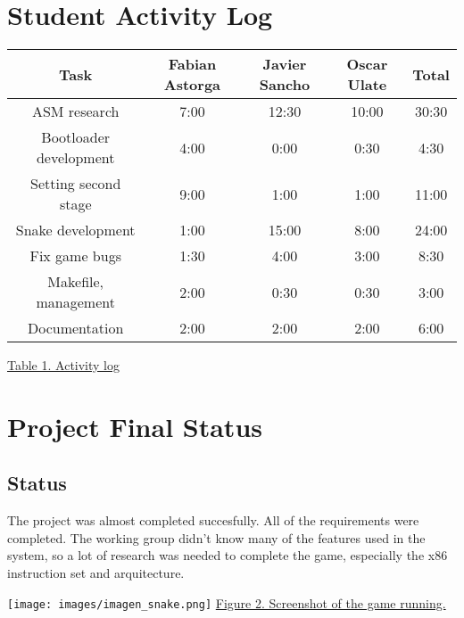\documentclass[11pt]{book}
\begin{document}
\newpage
\section*{Student Activity Log}

\begin{center}
  \begin{tabular}{|c|c|c|c|c|}
        \hline
    Task & Fabian Astorga & Javier Sancho & Oscar Ulate & Total \\
    \hline
    \hline
    ASM research & 7:00 & 12:30 & 10:00 & 30:30 \\
    \hline
    Bootloader development & 4:00 & 0:00 & 0:30 & 4:30 \\
    \hline
    Setting second stage & 9:00 & 1:00 & 1:00 & 11:00 \\
    \hline
    Snake development & 1:00 & 15:00 & 8:00 & 24:00 \\
    \hline
    Fix game bugs & 1:30 & 4:00 & 3:00 & 8:30 \\
    \hline
    Makefile, management & 2:00 & 0:30 & 0:30 & 3:00 \\
    \hline
    Documentation & 2:00 & 2:00 & 2:00 & 6:00 \\
    \hline

  \end{tabular}
  \newline \newline
  \underline{Table 1. Activity log}
\end{center}



\newpage
\section*{Project Final Status}
\subsection*{Status}

The project was almost completed succesfully. All of the requirements were completed. The working group didn't know many of the features used in the system, so a lot of research was needed to complete the game, especially the x86 instruction set and arquitecture.

\begin{center}
    \texttt{[image: images/imagen\_snake.png]} 
    \newline
\underline{Figure 2. Screenshot of the game running.}

\end{center}
\end{document}

